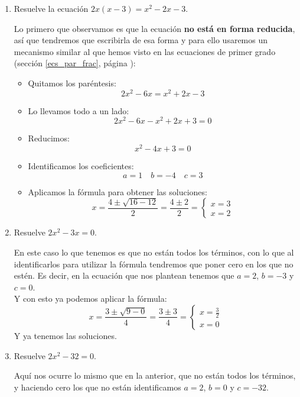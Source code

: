 \documentclass[a4paper,11pt,answers]{exam}
\begin{document}
\begin{enumerate}
\begin{solution}
    \end{solution}
    
  \item Resuelve la ecuación $2x(x-3) = x^2 - 2x-3$.
    \begin{solution}
      Lo primero que observamos es que la ecuación \textbf{no está en forma reducida}, así que tendremos que escribirla de esa forma y para ello usaremos un mecanismo similar al que hemos visto en las ecuaciones de primer grado (sección \ref{ecs_par_frac}, página \pageref{ecs_par_frac}):
      \begin{itemize}
      \item Quitamos los paréntesis:
        \[2x^2 - 6x = x^2 +2x - 3\]
      \item Lo llevamos todo a un lado:
        \[2x^2 - 6x - x^2 + 2x +  3 = 0\]
      \item Reducimos:
        \[x^2 - 4x + 3 = 0\]
      \item Identificamos los coeficientes:
        \[a=1\quad b = - 4\quad c= 3\]
      \item Aplicamos la fórmula para obtener las soluciones:
        \[x = \frac{4\pm \sqrt{16 - 12}}{2} = \frac{4 \pm 2}{2} =
          \begin{cases}
            x = 3\\x=2
          \end{cases}\]
      \end{itemize}
    \end{solution}
    
  \item Resuelve $2x^2 - 3x = 0$.
    \begin{solution}
      En este caso lo que tenemos es que no están todos los términos, con lo que al identificarlos para utilizar la fórmula tendremos que poner cero en los que no estén. Es decir, en la ecuación que nos plantean tenemos que $a=2$, $b=-3$ y $c=0$.\\
      Y con esto ya podemos aplicar la fórmula:
      \[x = \frac{3\pm \sqrt{9 - 0}}{4} = \frac{3\pm 3}{4} =
        \begin{cases}
          x = \frac{3}{2}\\x = 0
        \end{cases}\]
      Y ya tenemos las soluciones.
    \end{solution}
    
  \item Resuelve $2x^2 - 32 = 0$.
    
    \begin{solution}
      Aquí nos ocurre lo mismo que en la anterior, que no están todos los términos, y haciendo cero los que no están identificamos $a= 2$, $b = 0$ y $c = -32$.\\
      

\end{solution}
\end{enumerate}
\end{document}
